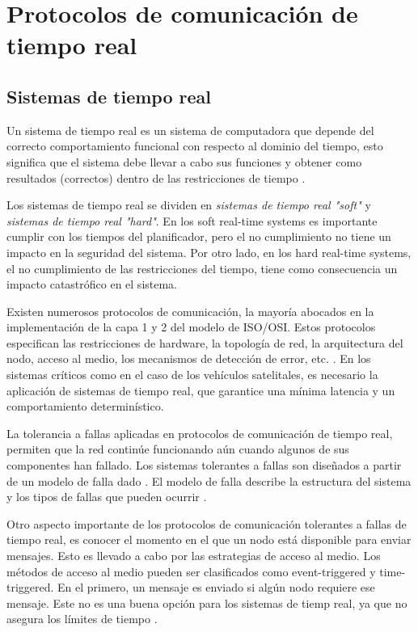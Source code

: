 \section{Protocolos de comunicación de tiempo real}\label{sec:protocolos_comunicacion}
\subsection{Sistemas de tiempo real}
Un sistema de tiempo real es un sistema de computadora que depende del correcto comportamiento funcional con respecto al dominio del tiempo, esto significa que el sistema debe llevar a cabo sus funciones y obtener como resultados (correctos) dentro de las restricciones de tiempo \citep{Lisner07}.

Los sistemas de tiempo real se dividen en \textit{sistemas de tiempo real "soft"} y \textit{sistemas de tiempo real "hard"}. En los soft real-time systems es importante cumplir con los tiempos del planificador, pero el no cumplimiento no tiene un impacto en la seguridad del sistema. Por otro lado, en los hard real-time systems, el no cumplimiento de las restricciones del tiempo, tiene como consecuencia un impacto catastrófico en el sistema.

Existen numerosos protocolos de comunicación, la mayoría abocados en  la implementación de la capa 1 y 2 del modelo de ISO/OSI. Estos protocolos especifican las restricciones de hardware, la topología de red, la arquitectura del nodo, acceso al medio, los mecanismos de detección  de error, etc. \citep{Lisner07}. En los sistemas críticos como en el caso de los vehículos satelitales, es necesario la aplicación de sistemas de tiempo real, que garantice una mínima latencia y un comportamiento determinístico.

La tolerancia a fallas aplicadas en protocolos de comunicación de tiempo real, permiten que la red continúe funcionando aún cuando algunos de sus componentes han fallado. Los sistemas tolerantes a fallas son diseñados a partir de un modelo de falla dado \citep{Lisner07}. El modelo de falla describe la estructura del sistema y los tipos de fallas que pueden ocurrir \citep{Lisner07}.

Otro aspecto importante de los protocolos de comunicación tolerantes a fallas de tiempo real, es conocer el momento en el que un nodo está disponible para enviar mensajes. Esto es llevado a cabo por las estrategias de acceso al medio. Los métodos de acceso al medio pueden ser clasificados como event-triggered y time-triggered. En el primero, un mensaje es enviado si algún nodo requiere ese mensaje. Este no es una buena opción para los sistemas de tiemp real, ya que no asegura los límites de tiempo \citep{Lisner07}.

